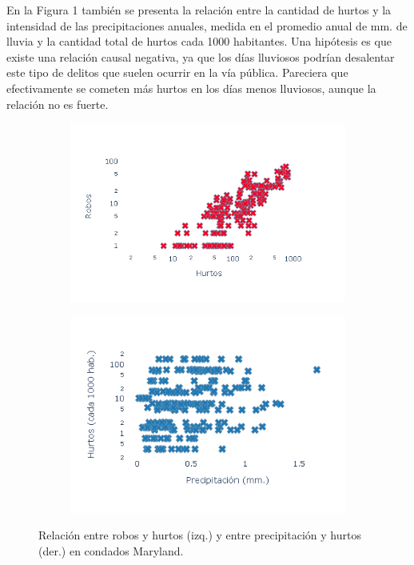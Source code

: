 \documentclass[10.5pt]{article}   %
\begin{document}
En la Figura 1 también se presenta la relación entre la cantidad de hurtos y la intensidad de las precipitaciones anuales, medida en el promedio anual de mm. de lluvia y la cantidad total de hurtos cada 1000 habitantes. Una hipótesis es que existe una relación causal negativa, ya que los días lluviosos podrían desalentar este tipo de delitos que suelen ocurrir en la vía pública. Pareciera que efectivamente se cometen más hurtos en los días menos lluviosos, aunque la relación no es fuerte. %
\begin{figure}[H]
\centering
\begin{subfigure}{.5\textwidth}
    \centering
     \textbf{}\par\medskip
    \includegraphics[scale=0.8]{robos.png}
    \label{fig2}
\end{subfigure}%
\begin{subfigure}{0.5\textwidth}
    \centering
     \textbf{}\par\medskip
    \includegraphics[scale=0.8]{plot_prec.png}
    \label{fig2}
\end{subfigure}%
\caption{Relación entre robos y hurtos (izq.) y entre precipitación y hurtos (der.) en condados Maryland.}
\end{figure}
\end{document}
